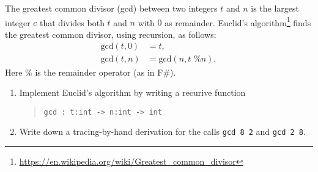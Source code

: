 \label{gcd} The greatest common divisor (gcd) between two integers $t$
and $n$ is the largest integer $c$ that divides both $t$ and $n$ with
$0$ as remainder. Euclid's
algorithm\footnote{\url{https://en.wikipedia.org/wiki/Greatest_common_divisor}}
finds the greatest common divisor, using recursion, as follows:
  \begin{align}
    \text{gcd}(t,0) &= t, \label{gcd:1}
    \\ \text{gcd}(t,n) &= \text{gcd}(n, t \text{ \% } n), \label{gcd:2}
  \end{align}
Here $\%$ is the remainder operator (as in F\#).
\begin{enumerate}
\item Implement Euclid's algorithm by writing a recurive function
  \begin{quote}
    \lstinline{gcd : t:int -> n:int -> int}
  \end{quote}
\item Write down a tracing-by-hand derivation for the calls \lstinline{gcd 8 2} and \lstinline{gcd 2 8}.
\end{enumerate}
